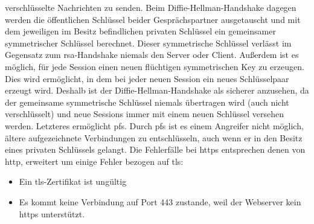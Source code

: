 \documentclass[titlepage]{report}
\begin{document}
verschlüsselte Nachrichten zu senden. Beim
Diffie\hyp{}Hellman\hyp{}Handshake dagegen werden die öffentlichen
Schlüssel beider Gesprächspartner ausgetauscht und mit dem jeweiligen im
Besitz befindlichen privaten Schlüssel ein gemeinsamer symmetrischer
Schlüssel berechnet. Dieser symmetrische Schlüssel verlässt im Gegensatz
zum \gls{rsa}\hyp{}Handshake niemals den Server oder Client. Außerdem
ist es möglich, für jede Session einen neuen flüchtigen symmetrischen Key
zu erzeugen. Dies wird ermöglicht, in dem bei jeder neuen Session ein
neues Schlüsselpaar erzeugt wird. Deshalb ist der
Diffie\hyp{}Hellman\hyp{}Handshake als sicherer anzusehen, da der
gemeinsame symmetrische Schlüssel niemals übertragen wird (auch nicht
verschlüsselt) und neue Sessions immer mit einem neuen Schlüssel
versehen werden. Letzteres ermöglicht \gls{pfs}. Durch \gls{pfs} ist es
einem Angreifer nicht möglich, ältere aufgezeichnete Verbindungen zu
entschlüsseln, auch wenn er in den Besitz eines privaten Schlüssels
gelangt.
Die Fehlerfälle bei \gls{https} entsprechen denen von \gls{http}, 
erweitert um einige Fehler bezogen auf \gls{tls}:
\begin{itemize}
    \item Ein \gls{tls}\hyp{}Zertifikat ist ungültig
    \item Es kommt keine Verbindung auf Port 443 zustande, weil der
          Webserver kein \gls{https} unterstützt.
\end{itemize}
\end{document}

